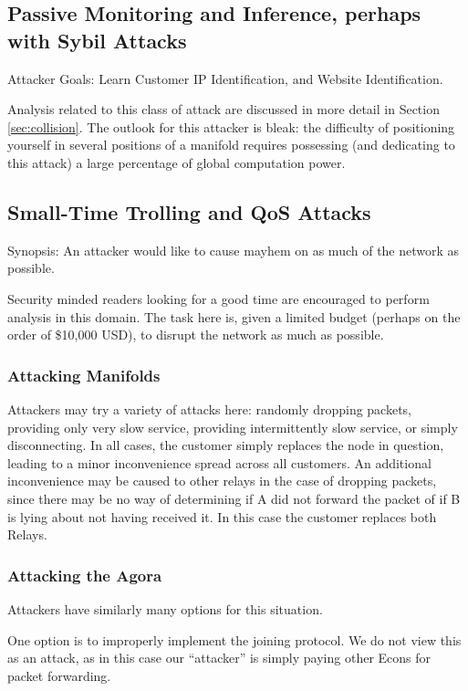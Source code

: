 \documentclass{article}
\begin{document}
\subsection{Passive Monitoring and Inference, perhaps with Sybil Attacks}

Attacker Goals: Learn Customer IP Identification, and Website Identification.

Analysis related to this class of attack are discussed in more detail
in Section \ref{sec:collision}. The outlook for this attacker is
bleak: the difficulty of positioning yourself in several positions of
a manifold requires possessing (and dedicating to this attack) a large
percentage of global computation power.

\subsection{Small-Time Trolling and QoS Attacks}

Synopsis: An attacker would like to cause mayhem on as much of the network as possible.

Security minded readers looking for a good time are encouraged to
perform analysis in this domain. The task here is, given a limited
budget (perhaps on the order of \$10,000 USD), to disrupt the network
as much as possible.

\subsubsection{Attacking Manifolds}

Attackers may try a variety of attacks here: randomly dropping
packets, providing only very slow service, providing intermittently
slow service, or simply disconnecting. In all cases, the customer
simply replaces the node in question, leading to a minor inconvenience
spread across all customers. An additional inconvenience may be caused
to other relays in the case of dropping packets, since there may be no
way of determining if A did not forward the packet of if B is lying
about not having received it. In this case the customer replaces both
Relays.

\subsubsection{Attacking the Agora}

Attackers have similarly many options for this situation.

One option is to improperly implement the joining protocol. We do not
view this as an attack, as in this case our ``attacker'' is simply
paying other Econs for packet forwarding.
\end{document}
